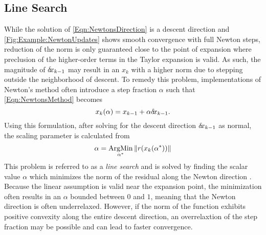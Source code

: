 \documentclass[12pt]{../UWMadThesis}
\begin{document}
\subsection{Line Search}
While the solution of \cref{Eqn:NewtonsDirection} is a descent direction and \cref{Fig:Example:NewtonUpdates} shows smooth convergence with full Newton steps, reduction of the norm is only guaranteed close to the point of expansion where preclusion of the higher-order terms in the Taylor expansion is valid.
As such, the magnitude of $\delta \mkern-3.00mu x_{k-1}$ may result in an $x_k$ with a higher norm due to stepping outside the neighborhood of descent.
To remedy this problem, implementations of Newton's method often introduce a step fraction $\alpha$ such that \cref{Eqn:NewtonsMethod} becomes
\begin{equation}
    x_k(\alpha) = x_{k-1} + \alpha \delta \mkern-3.00mu x_{k-1}.
\end{equation}
Using this formulation, after solving for the descent direction $\delta \mkern-3.00mu x_{k-1}$ as normal, the scaling parameter is calculated from
\begin{equation}
    \alpha = \operatorname*{ArgMin}_{\alpha^*}\|r(x_{k}(\alpha^*))\|
    \label{Eqn:ExactLineSearch}
\end{equation}
This problem is referred to as a \textit{line search} and is solved by finding the scalar value $\alpha$ which minimizes the norm of the residual along the Newton direction \cite{kelley_solving_2003}.
Because the linear assumption is valid near the expansion point, the minimization often results in an $\alpha$ bounded between $0$ and $1$, meaning that the Newton direction is often underrelaxed.
However, if the norm of the function exhibits positive convexity along the entire descent direction, an overrelaxtion of the step fraction may be possible and can lead to faster convergence.
\end{document}
